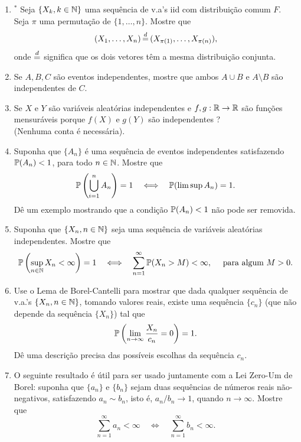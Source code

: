 \begin{enumerate}[leftmargin=*]
		
\item 
$^*$ Seja $\{X_k,k\in\N\}$ uma sequência de v.a's iid com distribuição
comum $F$. Seja $\pi$ uma permutação de $\{1,\ldots,n\}$. 
Mostre que 
	\[
		(X_1,\ldots,X_n) 
		\,{\buildrel d \over =}\, 
		(X_{\pi(1)},\ldots,X_{\pi(n)}),
	\]
onde ${\buildrel d \over =}$ significa que os dois vetores
têm a mesma distribuição conjunta. 



\item 
Se $A,B,C$ são eventos independentes, mostre que 
ambos $A\cup B$ e $A\setminus B$ são independentes de 
$C$.



\item Se $X$ e $Y$ são variáveis aleatórias independentes
e $f,g:\R\to\R$ são funções mensuráveis porque $f(X)$ e $g(Y)$
são independentes ?
\\
(Nenhuma conta é necessária).




\item
Suponha que $\{A_n\}$ é uma sequência de eventos independentes
satisfazendo $\P(A_n)<1$, para todo $n\in \N$. Mostre que 
	\[
		\P \left( \bigcup_{i=1}^n A_n \right) = 1
		\quad
		\Longleftrightarrow
		\quad
		\P(\limsup A_n) =1.
	\]
Dê um exemplo mostrando que a condição $\P(A_n)<1$ 
não pode ser removida.


\item 
Suponha que $\{X_n, n\in\N\}$ seja uma sequência de variáveis 
aleatórias independentes. Mostre que 
\[
	\P \left(  \sup_{n\in\N} X_n <\infty  \right)=1
	\quad
	\Longleftrightarrow
	\quad
	\sum_{n=1}^{\infty} \P(X_n>M) <\infty,\quad 
	\text{ para algum}\ M>0.
\]



\item
Use o Lema de Borel-Cantelli para mostrar que dada 
qualquer sequência de v.a.'s $\{X_n, n\in\N\}$, tomando valores 
reais, existe uma sequência 
$\{c_n\}$ (que não depende da sequência $\{X_n\}$) 
tal que 
	\[
		\P \left( \lim_{n\to\infty} \frac{X_n}{c_n}=0 \right)=1.
	\]
Dê uma descrição precisa das possíveis escolhas da sequência $c_n$.



\item 
O seguinte resultado é útil para ser usado juntamente 
com a Lei Zero-Um de Borel: suponha que $\{a_n\}$ 
e $\{b_n\}$ sejam duas sequências de números reais
não-negativos, satisfazendo $a_n \sim b_n$, 
isto é, $a_n/b_n\to 1$, quando $n\to\infty$.
Mostre que 
	\[	
		\sum_{n=1}^{\infty} a_n <\infty
		\quad
		\Longleftrightarrow
		\quad
		\sum_{n=1}^{\infty} b_n <\infty.
	\]	





\end{enumerate}
